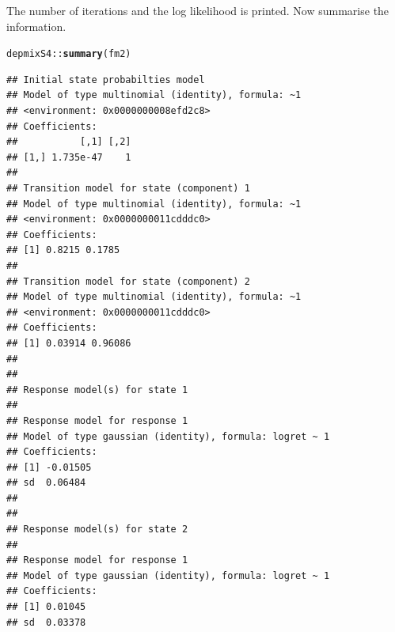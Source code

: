 \documentclass{article}\usepackage{graphicx, color}
\makeatletter
\newcommand{\hlfunctioncall}[1]{\textcolor[rgb]{0.501960784313725,0,0.329411764705882}{\textbf{#1}}}%
\newenvironment{kframe}{%
 \def\at@end@of@kframe{}%
 \ifinner\ifhmode%
  \def\at@end@of@kframe{\end{minipage}}%
  \begin{minipage}{\columnwidth}%
 \fi\fi%
 \def\FrameCommand##1{\hskip\@totalleftmargin \hskip-\fboxsep
 \colorbox{shadecolor}{##1}\hskip-\fboxsep
     \hskip-\linewidth \hskip-\@totalleftmargin \hskip\columnwidth}%
 \MakeFramed {\advance\hsize-\width
   \@totalleftmargin\z@ \linewidth\hsize
   \@setminipage}}%
 {\par\unskip\endMakeFramed%
 \at@end@of@kframe}
\newenvironment{knitrout}{}{} %
\makeatother
\begin{document}
The number of iterations and the log likelihood is printed.  Now summarise the information. 
\begin{knitrout}
\color{fgcolor}\begin{kframe}
\begin{alltt}
depmixS4::\hlfunctioncall{summary}(fm2)
\end{alltt}
\begin{verbatim}
## Initial state probabilties model 
## Model of type multinomial (identity), formula: ~1
## <environment: 0x0000000008efd2c8>
## Coefficients: 
##           [,1] [,2]
## [1,] 1.735e-47    1
## 
## Transition model for state (component) 1 
## Model of type multinomial (identity), formula: ~1
## <environment: 0x0000000011cdddc0>
## Coefficients: 
## [1] 0.8215 0.1785
## 
## Transition model for state (component) 2 
## Model of type multinomial (identity), formula: ~1
## <environment: 0x0000000011cdddc0>
## Coefficients: 
## [1] 0.03914 0.96086
## 
## 
## Response model(s) for state 1 
## 
## Response model for response 1 
## Model of type gaussian (identity), formula: logret ~ 1
## Coefficients: 
## [1] -0.01505
## sd  0.06484 
## 
## 
## Response model(s) for state 2 
## 
## Response model for response 1 
## Model of type gaussian (identity), formula: logret ~ 1
## Coefficients: 
## [1] 0.01045
## sd  0.03378
\end{verbatim}
\end{kframe}
\end{knitrout}
\end{document}
